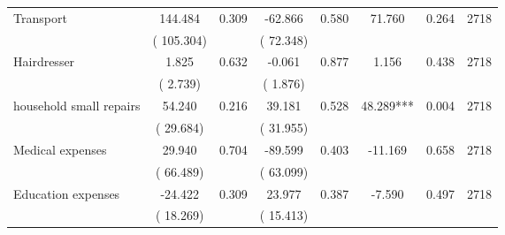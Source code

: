 \begin{tabular}{l*{7}{c}}
 Transport       &            144.484       &        0.309  &            -62.866       &        0.580  &             71.760       &              0.264 &  2718 \\ 
                       &       (     105.304)             &                               &       (      72.348)                     &                               &                                               &                                &                      \\ 

 Hairdresser       &              1.825       &        0.632  &             -0.061       &        0.877  &              1.156       &              0.438 &  2718 \\ 
                       &       (       2.739)             &                               &       (       1.876)                     &                               &                                               &                                &                      \\ 

 household small repairs       &             54.240       &        0.216  &             39.181       &        0.528  &             48.289***       &              0.004 &  2718 \\ 
                       &       (      29.684)             &                               &       (      31.955)                     &                               &                                               &                                &                      \\ 

 Medical expenses       &             29.940       &        0.704  &            -89.599       &        0.403  &            -11.169       &              0.658 &  2718 \\ 
                       &       (      66.489)             &                               &       (      63.099)                     &                               &                                               &                                &                      \\ 

 Education expenses       &            -24.422       &        0.309  &             23.977       &        0.387  &             -7.590       &              0.497 &  2718 \\ 
                       &       (      18.269)             &                               &       (      15.413)                     &                               &                                               &                                &                      \\ 


\end{tabular}
